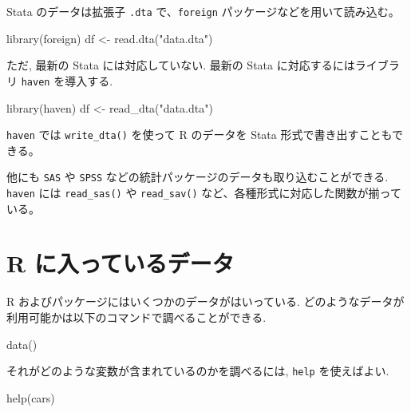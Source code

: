 \documentclass[
  letterpaper,
  xelatex,
  ja=standard, xelatex]{bxjsbook}
\newenvironment{Shaded}{\begin{snugshade}}{\end{snugshade}}
\newcommand{\FunctionTok}[1]{\textcolor[rgb]{0.28,0.35,0.67}{#1}}
\newcommand{\NormalTok}[1]{\textcolor[rgb]{0.00,0.23,0.31}{#1}}
\newcommand{\OtherTok}[1]{\textcolor[rgb]{0.00,0.23,0.31}{#1}}
\newcommand{\StringTok}[1]{\textcolor[rgb]{0.13,0.47,0.30}{#1}}
\begin{document}
Stata のデータは拡張子 \texttt{.dta} で、\texttt{foreign}
パッケージなどを用いて読み込む。

\begin{Shaded}
\begin{Highlighting}[]
\FunctionTok{library}\NormalTok{(foreign)}
\NormalTok{df }\OtherTok{\textless{}{-}} \FunctionTok{read.dta}\NormalTok{(}\StringTok{"data.dta"}\NormalTok{)}
\end{Highlighting}
\end{Shaded}

ただ, 最新の Stata には対応していない. 最新の Stata
に対応するにはライブラリ \texttt{haven} を導入する.

\begin{Shaded}
\begin{Highlighting}[]
\FunctionTok{library}\NormalTok{(haven)}
\NormalTok{df }\OtherTok{\textless{}{-}} \FunctionTok{read\_dta}\NormalTok{(}\StringTok{"data.dta"}\NormalTok{)}
\end{Highlighting}
\end{Shaded}

\texttt{haven} では \texttt{write\_dta()} を使って R のデータを Stata
形式で書き出すこともできる。

他にも \texttt{SAS} や \texttt{SPSS}
などの統計パッケージのデータも取り込むことができる. \texttt{haven} には
\texttt{read\_sas()} や \texttt{read\_sav()}
など、各種形式に対応した関数が揃っている。

\section{R
に入っているデータ}\label{r-ux306bux5165ux3063ux3066ux3044ux308bux30c7ux30fcux30bf}

R およびパッケージにはいくつかのデータがはいっている.
どのようなデータが利用可能かは以下のコマンドで調べることができる.

\begin{Shaded}
\begin{Highlighting}[]
\FunctionTok{data}\NormalTok{()}
\end{Highlighting}
\end{Shaded}

それがどのような変数が含まれているのかを調べるには, \texttt{help}
を使えばよい.

\begin{Shaded}
\begin{Highlighting}[]
\FunctionTok{help}\NormalTok{(cars)}
\end{Highlighting}
\end{Shaded}
\end{document}
